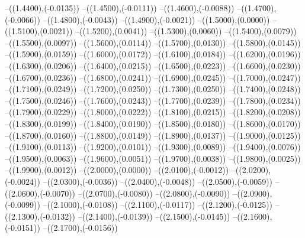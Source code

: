 {	--({\sx*(1.4400)},{\sy*(-0.0135)})
	--({\sx*(1.4500)},{\sy*(-0.0111)})
	--({\sx*(1.4600)},{\sy*(-0.0088)})
	--({\sx*(1.4700)},{\sy*(-0.0066)})
	--({\sx*(1.4800)},{\sy*(-0.0043)})
	--({\sx*(1.4900)},{\sy*(-0.0021)})
	--({\sx*(1.5000)},{\sy*(0.0000)})
	--({\sx*(1.5100)},{\sy*(0.0021)})
	--({\sx*(1.5200)},{\sy*(0.0041)})
	--({\sx*(1.5300)},{\sy*(0.0060)})
	--({\sx*(1.5400)},{\sy*(0.0079)})
	--({\sx*(1.5500)},{\sy*(0.0097)})
	--({\sx*(1.5600)},{\sy*(0.0114)})
	--({\sx*(1.5700)},{\sy*(0.0130)})
	--({\sx*(1.5800)},{\sy*(0.0145)})
	--({\sx*(1.5900)},{\sy*(0.0159)})
	--({\sx*(1.6000)},{\sy*(0.0172)})
	--({\sx*(1.6100)},{\sy*(0.0184)})
	--({\sx*(1.6200)},{\sy*(0.0196)})
	--({\sx*(1.6300)},{\sy*(0.0206)})
	--({\sx*(1.6400)},{\sy*(0.0215)})
	--({\sx*(1.6500)},{\sy*(0.0223)})
	--({\sx*(1.6600)},{\sy*(0.0230)})
	--({\sx*(1.6700)},{\sy*(0.0236)})
	--({\sx*(1.6800)},{\sy*(0.0241)})
	--({\sx*(1.6900)},{\sy*(0.0245)})
	--({\sx*(1.7000)},{\sy*(0.0247)})
	--({\sx*(1.7100)},{\sy*(0.0249)})
	--({\sx*(1.7200)},{\sy*(0.0250)})
	--({\sx*(1.7300)},{\sy*(0.0250)})
	--({\sx*(1.7400)},{\sy*(0.0248)})
	--({\sx*(1.7500)},{\sy*(0.0246)})
	--({\sx*(1.7600)},{\sy*(0.0243)})
	--({\sx*(1.7700)},{\sy*(0.0239)})
	--({\sx*(1.7800)},{\sy*(0.0234)})
	--({\sx*(1.7900)},{\sy*(0.0229)})
	--({\sx*(1.8000)},{\sy*(0.0222)})
	--({\sx*(1.8100)},{\sy*(0.0215)})
	--({\sx*(1.8200)},{\sy*(0.0208)})
	--({\sx*(1.8300)},{\sy*(0.0199)})
	--({\sx*(1.8400)},{\sy*(0.0190)})
	--({\sx*(1.8500)},{\sy*(0.0180)})
	--({\sx*(1.8600)},{\sy*(0.0170)})
	--({\sx*(1.8700)},{\sy*(0.0160)})
	--({\sx*(1.8800)},{\sy*(0.0149)})
	--({\sx*(1.8900)},{\sy*(0.0137)})
	--({\sx*(1.9000)},{\sy*(0.0125)})
	--({\sx*(1.9100)},{\sy*(0.0113)})
	--({\sx*(1.9200)},{\sy*(0.0101)})
	--({\sx*(1.9300)},{\sy*(0.0089)})
	--({\sx*(1.9400)},{\sy*(0.0076)})
	--({\sx*(1.9500)},{\sy*(0.0063)})
	--({\sx*(1.9600)},{\sy*(0.0051)})
	--({\sx*(1.9700)},{\sy*(0.0038)})
	--({\sx*(1.9800)},{\sy*(0.0025)})
	--({\sx*(1.9900)},{\sy*(0.0012)})
	--({\sx*(2.0000)},{\sy*(0.0000)})
	--({\sx*(2.0100)},{\sy*(-0.0012)})
	--({\sx*(2.0200)},{\sy*(-0.0024)})
	--({\sx*(2.0300)},{\sy*(-0.0036)})
	--({\sx*(2.0400)},{\sy*(-0.0048)})
	--({\sx*(2.0500)},{\sy*(-0.0059)})
	--({\sx*(2.0600)},{\sy*(-0.0070)})
	--({\sx*(2.0700)},{\sy*(-0.0080)})
	--({\sx*(2.0800)},{\sy*(-0.0090)})
	--({\sx*(2.0900)},{\sy*(-0.0099)})
	--({\sx*(2.1000)},{\sy*(-0.0108)})
	--({\sx*(2.1100)},{\sy*(-0.0117)})
	--({\sx*(2.1200)},{\sy*(-0.0125)})
	--({\sx*(2.1300)},{\sy*(-0.0132)})
	--({\sx*(2.1400)},{\sy*(-0.0139)})
	--({\sx*(2.1500)},{\sy*(-0.0145)})
	--({\sx*(2.1600)},{\sy*(-0.0151)})
	--({\sx*(2.1700)},{\sy*(-0.0156)})
}
